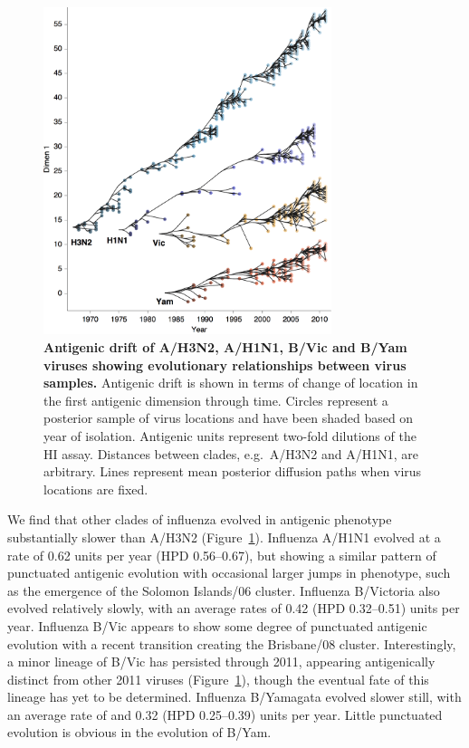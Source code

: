 \documentclass[11pt,oneside,letterpaper]{article}
\begin{document}
\begin{figure}[h]
	\centering		
	\includegraphics[width=0.75\textwidth]{figures/drift}
	\caption{\textbf{Antigenic drift of A/H3N2, A/H1N1, B/Vic and B/Yam viruses showing evolutionary relationships between virus samples.} 
	Antigenic drift is shown in terms of change of location in the first antigenic dimension through time.
	Circles represent a posterior sample of virus locations and have been shaded based on year of isolation.
	Antigenic units represent two-fold dilutions of the HI assay.
	Distances between clades, e.g.\ A/H3N2 and A/H1N1, are arbitrary.
	Lines represent mean posterior diffusion paths when virus locations are fixed.} 
	\label{drift} 
\end{figure}

We find that other clades of influenza evolved in antigenic phenotype substantially slower than A/H3N2 (Figure~\ref{drift}).
Influenza A/H1N1 evolved at a rate of 0.62 units per year (HPD 0.56--0.67), but showing a similar pattern of punctuated antigenic evolution with occasional larger jumps in phenotype, such as the emergence of the Solomon Islands/06 cluster.  
Influenza B/Victoria also evolved relatively slowly, with an average rates of 0.42 (HPD 0.32--0.51) units per year.
Influenza B/Vic appears to show some degree of punctuated antigenic evolution with a recent transition creating the Brisbane/08 cluster.
Interestingly, a minor lineage of B/Vic has persisted through 2011, appearing antigenically distinct from other 2011 viruses (Figure~\ref{drift}), though the eventual fate of this lineage has yet to be determined.
Influenza B/Yamagata evolved slower still, with an average rate of and 0.32 (HPD 0.25--0.39) units per year.
Little punctuated evolution is obvious in the evolution of B/Yam.
\end{document}
